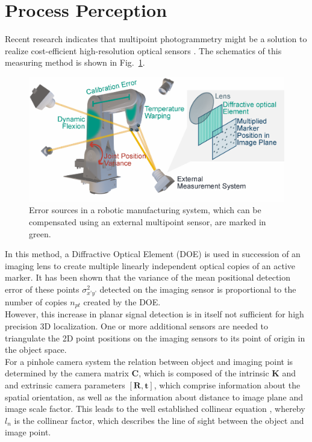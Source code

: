 \documentclass[5p,times,procedia]{elsarticle}
\begin{document}
\section{Process Perception}
%
Recent research indicates that multipoint photogrammetry might be a solution to realize cost-efficient high-resolution optical sensors \cite{Hartlieb_2021}.
The schematics of this measuring method is shown in Fig.~\ref{fig:MeasSys_Errors}.
\begin{figure}[h]
	\centering
	\includegraphics[width=1.0\columnwidth]{graphics/error_sources.eps}
	\caption{Error sources in a robotic manufacturing system, which can be compensated using an external multipoint  sensor, are marked in green.}
	\label{fig:MeasSys_Errors}
\end{figure}
In this method, a Diffractive Optical Element (DOE) is used in succession of an imaging lens to create multiple linearly independent optical copies of an active marker.
It has been shown \cite{Hartlieb_2021} that the variance of the mean positional detection error of these points $\sigma_{x’y’}^2$ detected on the imaging sensor is proportional to the number of copies $n_{pt}$ created by the DOE.\\
However, this increase in planar signal detection is in itself not sufficient for high precision 3D localization. One or more additional sensors are needed to triangulate the 2D point positions on the imaging sensors to its point of origin in the object space. \\
For a pinhole camera system the relation between object and imaging point is determined by the camera matrix $\mathbf{C}$, which is composed of the intrinsic $\mathbf{K}$ and  and extrinsic camera parameters $[\mathbf{R}, \mathbf{t}]$, which comprise information about the spatial orientation, as well as the information about distance to image plane and
image scale factor. This leads to the well established collinear equation \cite{Luhmann2003}, whereby $l_n$ is the collinear factor, which describes the line of sight between the object and image point.
\end{document}
